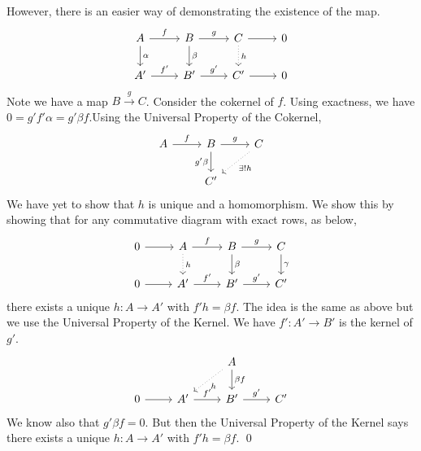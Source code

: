However, there is an easier way of demonstrating the existence of the map.  
        \[
        \begin{tikzcd}
        A \arrow{r}{f} \arrow{d}{\alpha} & B \arrow{r}{g} \arrow{d}{\beta} & C \arrow{r} \arrow[dotted]{d}{h} & 0 \\
        A' \arrow{r}{f'} & B' \arrow{r}{g'} & C' \arrow{r} & 0
        \end{tikzcd}
        \]
Note we have a map $B \stackrel{g}{\longrightarrow} C$. Consider the cokernel of $f$. Using exactness, we have $0= g' f' \alpha= g' \beta f$.Using the Universal Property of the Cokernel,
        \[
        \begin{tikzcd}
        A \arrow{r}{f} & B \arrow[swap]{d}{g'\beta} \arrow{r}{g} & C \arrow[dotted]{dl}{\exists!h} \\
        & C' & 
        \end{tikzcd}
        \]
We have yet to show that $h$ is unique and a homomorphism. We show this by showing that for any commutative diagram with exact rows, as below,
\[
\begin{tikzcd}
0 \arrow{r} & A \arrow{r}{f} \arrow[dotted]{d}{h} & B \arrow{r}{g} \arrow{d}{\beta} & C \arrow{d}{\gamma} \\
0 \arrow{r} & A' \arrow{r}{f'} & B' \arrow{r}{g'}  & C'
\end{tikzcd}
\]
there exists a unique $h: A \rightarrow A'$ with $f'h=\beta f$. The idea is the same as above but we use the Universal Property of the Kernel. We have $f': A' \rightarrow B'$ is the kernel of $g'$.
\[
\begin{tikzcd}
\; & \; & A \arrow[dotted]{dl}{h} \arrow{d}{\beta f} & \\
0 \arrow{r} & A' \arrow{r}{f'} & B' \arrow{r}{g'} & C'
\end{tikzcd}
\]
We know also that $g'\beta f=0$. But then the Universal Property of the Kernel says there exists a unique $h: A \rightarrow A'$ with $f'h=\beta f$. \qed \\


























